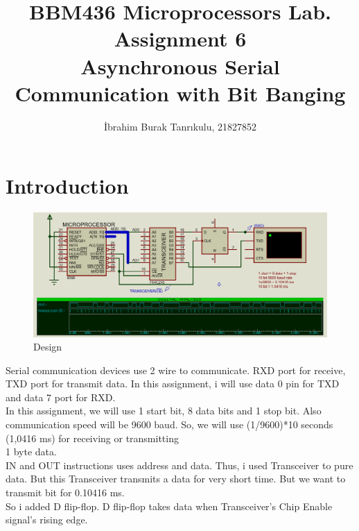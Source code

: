 \documentclass[11pt]{article}
\begin{document}
\author{İbrahim Burak Tanrıkulu, 21827852}
\title{BBM436 Microprocessors Lab.\\Assignment 6\\Asynchronous Serial Communication with Bit Banging}
\maketitle

\section{Introduction}
\begin{figure}[h!]
	\centering
	\includegraphics[width=17cm]{Tasarım.png}
	\caption{Design}
	\label{fig:Tasarım}
\end{figure}
Serial communication devices use 2 wire to communicate. RXD port for receive, TXD port for transmit data. In this assignment, i will use data 0 pin for TXD and data 7 port for RXD.
\\ In this assignment, we will use 1 start bit, 8 data bits and 1 stop bit. Also communication speed will be 9600 baud. So, we will use (1/9600)*10 seconds (1,0416 ms) for receiving or transmitting \\1 byte data. 
\\IN and OUT instructions uses address and data. Thus, i used Transceiver to pure data. But this Transceiver transmits a data for very short time. But we want to transmit bit for 0.10416 ms. \\So i added D flip-flop. D flip-flop takes data when Transceiver's Chip Enable signal's rising edge.
\end{document}
